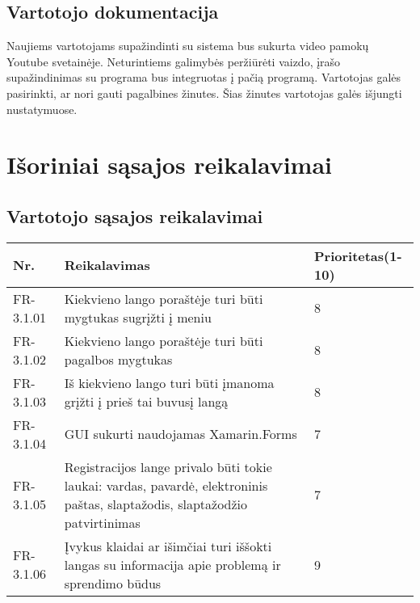 \documentclass[oneside]{VUMIFPSkursinis}
\begin{document}
\subsection{Vartotojo dokumentacija}
Naujiems vartotojams supažindinti su sistema bus sukurta video pamokų Youtube svetainėje. Neturintiems galimybės peržiūrėti vaizdo, įrašo supažindinimas su programa bus integruotas į pačią programą. Vartotojas galės pasirinkti, ar nori gauti pagalbines žinutes. Šias žinutes vartotojas galės išjungti nustatymuose. 

\section{Išoriniai sąsajos reikalavimai}
\subsection{Vartotojo sąsajos reikalavimai}
\begin{table}[htbp]
	\begin{tabularx}{1\textwidth}{ |P{2.5cm}|X|P{3cm }| }  \hline
		Nr. & Reikalavimas & Prioritetas(1-10) \\ \hline
		FR-3.1.01 & Kiekvieno lango poraštėje turi būti mygtukas sugrįžti į meniu & 8 \\ \hline
		FR-3.1.02 & Kiekvieno lango poraštėje turi būti pagalbos mygtukas & 8 \\ \hline
		FR-3.1.03 & Iš kiekvieno lango turi būti įmanoma grįžti į prieš tai buvusį langą & 8 \\ \hline
		FR-3.1.04 & GUI sukurti naudojamas Xamarin.Forms & 7 \\ \hline
		FR-3.1.05 & Registracijos lange privalo būti tokie laukai: vardas, pavardė, elektroninis paštas, slaptažodis, slaptažodžio patvirtinimas & 7 \\ \hline
		FR-3.1.06 & Įvykus klaidai ar išimčiai turi iššokti langas su informacija apie problemą ir sprendimo būdus & 9 \\ \hline
	\end{tabularx}
\end{table}
\end{document}
